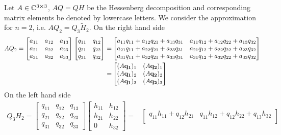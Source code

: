 \begin{example}
	Let \(A\in \mathbb{C}^{3\cross 3}\), \(AQ=QH\) be the Hessenberg decomposition and corresponding matrix elements
	be denoted by lowercase letters. We consider the approximation for \(n = 2\), i.e. \(AQ_2 = Q_3 \tilde{H}_2\).
	On the right hand side
	\begin{align*}
		AQ_2 = 
		\begin{bmatrix}
			a_{11} & a_{12} & a_{13} \\
			a_{21} & a_{22} & a_{23} \\
			a_{31} & a_{32} & a_{33}
			\end{bmatrix}
			\begin{bmatrix}
			q_{11} & q_{12} \\
			q_{21} & q_{22} \\
			q_{31} & q_{32}
			\end{bmatrix}
			=&
			\begin{bmatrix}
			a_{11}q_{11} + a_{12}q_{21} + a_{13}q_{31} & a_{11}q_{12} + a_{12}q_{22} + a_{13}q_{32} \\
			a_{21}q_{11} + a_{22}q_{21} + a_{23}q_{31} & a_{21}q_{12} + a_{22}q_{22} + a_{23}q_{32} \\
			a_{31}q_{11} + a_{32}q_{21} + a_{33}q_{31} & a_{31}q_{12} + a_{32}q_{22} + a_{33}q_{32}
			\end{bmatrix} \\
			=&
			\begin{bmatrix}
				(A\vectorbold{q_1})_1 & (A\vectorbold{q_2})_1 \\
				(A\vectorbold{q_1})_2 & (A\vectorbold{q_2})_2 \\
				(A\vectorbold{q_1})_3 & (A\vectorbold{q_2})_3
			\end{bmatrix}
	\end{align*}
	On the left hand side
	\begin{align*}
		Q_3 H_2 = 
		\begin{bmatrix}
			q_{11} & q_{12} & q_{13} \\
			q_{21} & q_{22} & q_{23} \\
			q_{31} & q_{32} & q_{33}
			\end{bmatrix}
			\begin{bmatrix}
			h_{11} & h_{12} \\
			h_{21} & h_{22} \\
			0 & h_{32}
			\end{bmatrix}
			=&
			\begin{bmatrix}
				q_{11}h_{11} + q_{12}h_{21} & q_{11}h_{12} + q_{12}h_{22} + q_{13}h_{32} \\

\end{bmatrix}
\end{align*}
\end{example}
